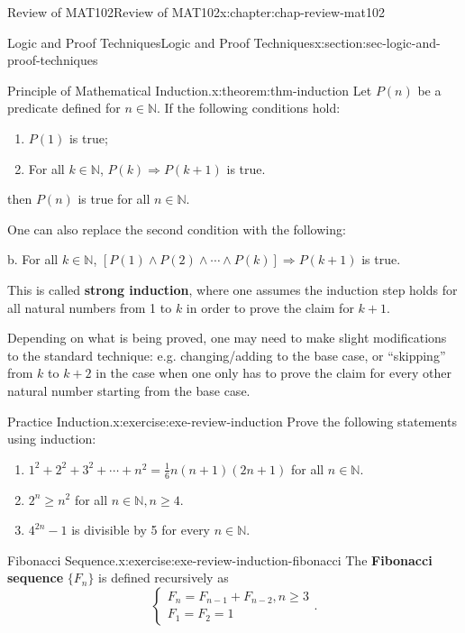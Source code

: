 \documentclass[oneside,10pt,]{book}
\newcommand{\terminology}[1]{\textbf{#1}}
\numberwithin{equation}{section}
\begin{document}
\begin{chapterptx}{Review of MAT102}{}{Review of MAT102}{}{}{x:chapter:chap-review-mat102}
\begin{sectionptx}{Logic and Proof Techniques}{}{Logic and Proof Techniques}{}{}{x:section:sec-logic-and-proof-techniques}
\begin{theorem}{Principle of Mathematical Induction.}{}{x:theorem:thm-induction}%
Let \(P(n)\) be a predicate defined for \(n \in \mathbb{N}\). If the following conditions hold:%
\begin{enumerate}[label=(\alph*)]
\item{}\(P(1)\) is true;%
\item{}For all \(k \in \mathbb{N}\), \(P(k) \Rightarrow P(k+1)\) is true.%
\end{enumerate}
then \(P(n)\) is true for all \(n \in \mathbb{N}\).%
\par
One can also replace the second condition with the following:%
\par
b.\textasteriskcentered{} For all \(k \in \mathbb{N}\), \([P(1) \wedge P(2) \wedge \cdots \wedge P(k)] \Rightarrow P(k+1)\) is true.%
\par
This is called \terminology{strong induction}, where one assumes the induction step holds for all natural numbers from 1 to \(k\) in order to prove the claim for \(k+1\).%
\end{theorem}
Depending on what is being proved, one may need to make slight modifications to the standard technique: e.g. changing\slash{}adding to the base case, or ``skipping'' from \(k\) to \(k+2\) in the case when one only has to prove the claim for every other natural number starting from the base case.%
\begin{inlineexercise}{Practice Induction.}{x:exercise:exe-review-induction}%
Prove the following statements using induction:%
%
\begin{enumerate}[label=(\alph*)]
\item{}\(1^2 + 2^2 + 3^2 + \cdots + n^2 = \frac{1}{6}n(n+1)(2n+1)\) for all \(n \in \mathbb{N}\).%
\item{}\(2^n \geq n^2\) for all \(n \in \mathbb{N}, n \geq 4\).%
\item{}\(4^{2n} -1\) is divisible by 5 for every \(n \in \mathbb{N}\).%
\end{enumerate}
\end{inlineexercise}%
\begin{inlineexercise}{Fibonacci Sequence.}{x:exercise:exe-review-induction-fibonacci}%
The \terminology{Fibonacci sequence} \(\{F_n\}\) is defined recursively as%
\begin{equation*}
\begin{cases} F_n = F_{n-1} + F_{n-2}, n \geq 3 \\
F_1 = F_2 = 1 \end{cases}\text{.}

\end{equation*}
\end{inlineexercise}
\end{sectionptx}
\end{chapterptx}
\end{document}

